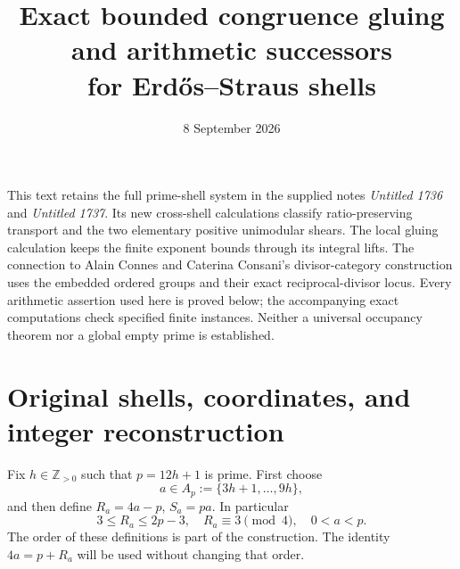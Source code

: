 \documentclass[11pt]{article}
\title{Exact bounded congruence gluing and arithmetic successors\\
for Erd\H{o}s--Straus shells}
\author{}
\date{8 September 2026}
\theoremstyle{definition}\newtheorem{definition}[theorem]{Definition}
\theoremstyle{remark}\newtheorem{remark}[theorem]{Remark}
\newcommand{\Z}{\mathbb Z}\newcommand{\Q}{\mathbb Q}
\begin{document}
\maketitle

This text retains the full prime-shell system in the supplied notes
\emph{Untitled 1736} and \emph{Untitled 1737}.  Its new cross-shell
calculations classify ratio-preserving transport and the two elementary
positive unimodular shears.  The local gluing calculation keeps the
finite exponent bounds through its integral lifts.  The connection to
Alain Connes and Caterina Consani's divisor-category construction uses
the embedded ordered groups and their exact reciprocal-divisor locus.
Every arithmetic assertion used here is proved below; the accompanying
exact computations check specified finite instances.  Neither a universal
occupancy theorem nor a global empty prime is established.

\section{Original shells, coordinates, and integer reconstruction}

Fix \(h\in\Z_{>0}\) such that \(p=12h+1\) is prime.  First choose
\[
 a\in A_p:=\{3h+1,\ldots,9h\},
\]
and then define \(R_a=4a-p\), \(S_a=pa\).  In particular
\[
 3\le R_a\le2p-3,\quad R_a\equiv3\pmod4,\quad 0<a<p.
\]
The order of these definitions is part of the construction.  The
identity \(4a=p+R_a\) will be used without changing that order.
\end{document}
